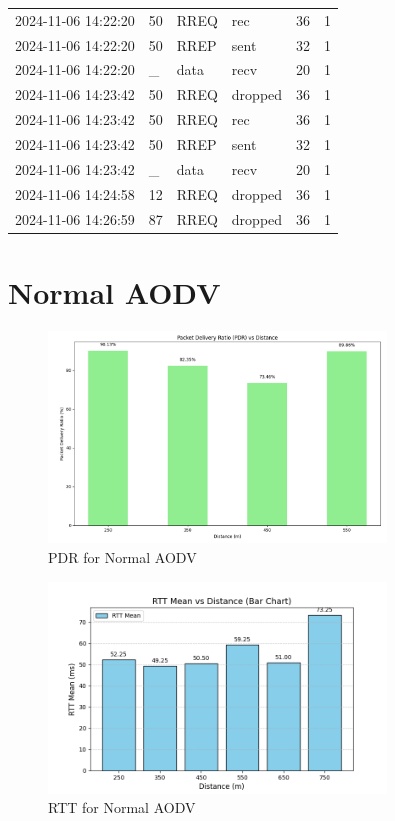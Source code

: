 \documentclass[]{nsm-thesis}
\begin{document}
\begin{longtable}{llllll}
2024-11-06 14:22:20 & 50 & RREQ & rec & 36 & 1 \\
2024-11-06 14:22:20 & 50 & RREP & sent & 32 & 1 \\
2024-11-06 14:22:20 & _ & data & recv & 20 & 1 \\
2024-11-06 14:23:42 & 50 & RREQ & dropped & 36 & 1 \\
2024-11-06 14:23:42 & 50 & RREQ & rec & 36 & 1 \\
2024-11-06 14:23:42 & 50 & RREP & sent & 32 & 1 \\
2024-11-06 14:23:42 & _ & data & recv & 20 & 1 \\
2024-11-06 14:24:58 & 12 & RREQ & dropped & 36 & 1 \\
2024-11-06 14:26:59 & 87 & RREQ & dropped & 36 & 1 \\
\bottomrule
\end{longtable}
\clearpage

\section{Normal AODV}

\begin{figure}[h!]
    \centering
    \includegraphics[width=0.8\textwidth]{image/PDR.png}
    \caption{PDR for Normal AODV}
    \label{fig:rtt_normal_aodv}
\end{figure}
\begin{figure}[h!]
    \centering
    \includegraphics[width=0.8\textwidth]{image/RTT_2Hops.png}
    \caption{RTT for Normal AODV}
    \label{normal_aodv}
\end{figure}
\clearpage
\end{document}
